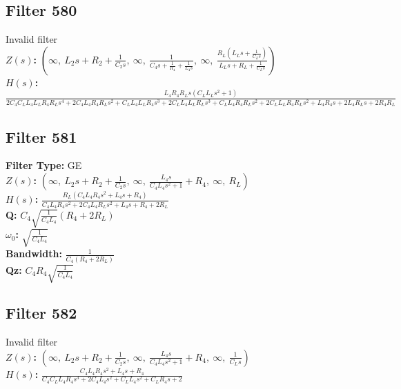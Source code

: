 \documentclass{article}
\begin{document}
\subsection*{Filter 580}
Invalid filter \\ 
\textbf{$Z(s)$:} $\left( \infty, \  L_{2} s + R_{2} + \frac{1}{C_{2} s}, \  \infty, \  \frac{1}{C_{4} s + \frac{1}{R_{4}} + \frac{1}{L_{4} s}}, \  \infty, \  \frac{R_{L} \left(L_{L} s + \frac{1}{C_{L} s}\right)}{L_{L} s + R_{L} + \frac{1}{C_{L} s}}\right)$ \\ 
\textbf{$H(s)$:} $\frac{L_{4} R_{4} R_{L} s \left(C_{L} L_{L} s^{2} + 1\right)}{2 C_{4} C_{L} L_{4} L_{L} R_{4} R_{L} s^{4} + 2 C_{4} L_{4} R_{4} R_{L} s^{2} + C_{L} L_{4} L_{L} R_{4} s^{3} + 2 C_{L} L_{4} L_{L} R_{L} s^{3} + C_{L} L_{4} R_{4} R_{L} s^{2} + 2 C_{L} L_{L} R_{4} R_{L} s^{2} + L_{4} R_{4} s + 2 L_{4} R_{L} s + 2 R_{4} R_{L}}$ \\ 
\subsection*{Filter 581}
\textbf{Filter Type:} GE \\ 
\textbf{$Z(s)$:} $\left( \infty, \  L_{2} s + R_{2} + \frac{1}{C_{2} s}, \  \infty, \  \frac{L_{4} s}{C_{4} L_{4} s^{2} + 1} + R_{4}, \  \infty, \  R_{L}\right)$ \\ 
\textbf{$H(s)$:} $\frac{R_{L} \left(C_{4} L_{4} R_{4} s^{2} + L_{4} s + R_{4}\right)}{C_{4} L_{4} R_{4} s^{2} + 2 C_{4} L_{4} R_{L} s^{2} + L_{4} s + R_{4} + 2 R_{L}}$ \\ 
\textbf{Q:} $C_{4} \sqrt{\frac{1}{C_{4} L_{4}}} \left(R_{4} + 2 R_{L}\right)$ \\ 
\textbf{$\omega_0$:} $\sqrt{\frac{1}{C_{4} L_{4}}}$ \\ 
\textbf{Bandwidth:} $\frac{1}{C_{4} \left(R_{4} + 2 R_{L}\right)}$ \\ 
\textbf{Qz:} $C_{4} R_{4} \sqrt{\frac{1}{C_{4} L_{4}}}$ \\ 
\subsection*{Filter 582}
Invalid filter \\ 
\textbf{$Z(s)$:} $\left( \infty, \  L_{2} s + R_{2} + \frac{1}{C_{2} s}, \  \infty, \  \frac{L_{4} s}{C_{4} L_{4} s^{2} + 1} + R_{4}, \  \infty, \  \frac{1}{C_{L} s}\right)$ \\ 
\textbf{$H(s)$:} $\frac{C_{4} L_{4} R_{4} s^{2} + L_{4} s + R_{4}}{C_{4} C_{L} L_{4} R_{4} s^{3} + 2 C_{4} L_{4} s^{2} + C_{L} L_{4} s^{2} + C_{L} R_{4} s + 2}$ \\ 
\end{document}
